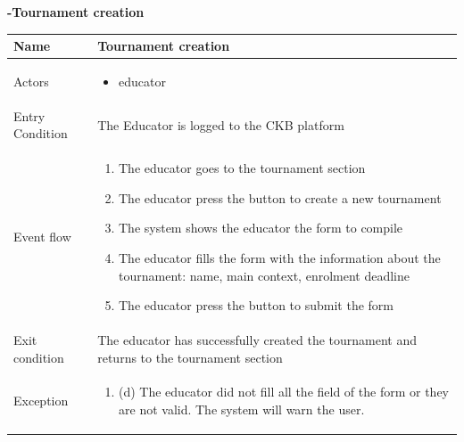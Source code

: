 \begin{enumerate}[label=\textbf{[UC\arabic*]}]
\item  \textbf{-Tournament creation}
\\\begin{tabular}{|l|p{11cm}|}
        \hline
        Name & Tournament creation \\
        \hline
        Actors & \begin{itemize}
                    \item educator
                \end{itemize} \\
        \hline
        Entry Condition & The Educator is logged to the CKB platform\\
        \hline
        Event flow & \begin{enumerate}
            \item The educator goes to the tournament section
            \item The educator press the button to create a new tournament
            \item The system shows the educator the form to compile
            \item The educator fills the form with the information about the tournament:
            name, main context, enrolment deadline
            \item The educator press the button to submit the form
        \end{enumerate}\\
        \hline
        Exit condition & The educator has successfully created the tournament and returns to the tournament section  \\
        \hline
        Exception & \begin{enumerate} [label={}, leftmargin=0.25cm ]
            \item (d) The educator did not fill all the field of the form or they are not valid. The system will warn the user.
        \end{enumerate} \\
        \hline            
    \end{tabular}


\end{enumerate}

